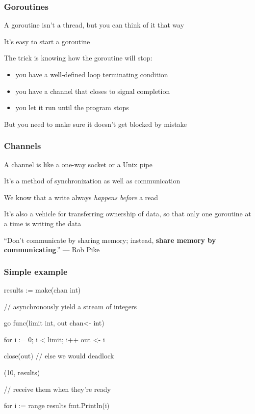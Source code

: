 \documentclass[handout,compress,t,11pt]{beamer}
\begin{document}
\begin{frame}[fragile]
    \frametitle{Goroutines}
    A goroutine isn't a thread, but you can think of it that way \par
    \vspace{2\baselineskip}
    It's easy to start a goroutine \par
    \vspace{\baselineskip}
    The trick is knowing how the goroutine will stop: 
    \begin{itemize}
        \item you have a well-defined loop terminating condition
        \item you have a channel that closes to signal completion
        \item you let it run until the program stops
    \end{itemize}
    \vspace{1.5\baselineskip}
    But you need to make sure it doesn't get blocked by mistake 
\end{frame}

\begin{frame}[fragile]
    \frametitle{Channels}
    A channel is like a one-way socket or a Unix pipe \par
    \vspace{2\baselineskip}
    It's a method of synchronization as well as communication  \par
    \vspace{\baselineskip}
    We know that a write always {\em happens before} a read  \par
    \vspace{2\baselineskip}
    It's also a vehicle for transferring ownership of data, so that
    only one goroutine at a time is writing the data \par
    \vspace{\baselineskip}
    ``Don't communicate by sharing memory; instead, {\bf share memory by 
        communicating}.'' --- Rob Pike
\end{frame}

\begin{frame}[fragile]
\frametitle{Simple example}
\begin{golang}
results := make(chan int)

// asynchronously yield a stream of integers

go func(limit int, out chan<- int) {
    for i := 0; i < limit; i++ {
        out <- i
    }

    close(out)  // else we would deadlock
}(10, results)

// receive them when they're ready

for i := range results {
    fmt.Println(i)
}
\end{golang}
\end{frame}
\end{document}
